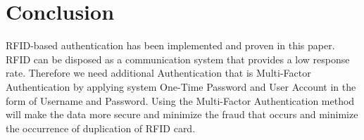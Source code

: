 \section{Conclusion}
\label{Conclusion}
RFID-based authentication has been implemented and proven in this paper. RFID can be disposed as a communication system that provides a low response rate. Therefore we need additional Authentication that is Multi-Factor Authentication by applying system One-Time Password and User Account in the form of Username and Password. Using the Multi-Factor Authentication method will make the data more secure and minimize the fraud that occurs and minimize the occurrence of duplication of RFID card.